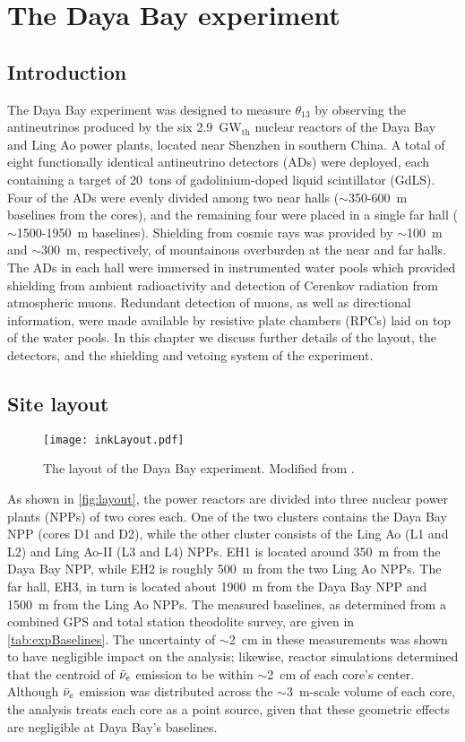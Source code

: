 \documentclass[../thesis.tex]{subfiles}
\begin{document}
\chapter{The Daya Bay experiment}
\label{chap:experim}

\section*{Introduction}

The Daya Bay experiment was designed to measure $\theta_{13}$ by observing the antineutrinos produced by the six 2.9~GW$_{\text{th}}$ nuclear reactors of the Daya Bay and Ling Ao power plants, located near Shenzhen in southern China. A total of eight functionally identical antineutrino detectors (ADs) were deployed, each containing a target of 20~tons of gadolinium-doped liquid scintillator (GdLS). Four of the ADs were evenly divided among two near halls ($\sim$350-600~m baselines from the cores), and the remaining four were placed in a single far hall ($\sim$1500-1950~m baselines). Shielding from cosmic rays was provided by $\sim$100~m and $\sim$300~m, respectively, of mountainous overburden at the near and far halls. The ADs in each hall were immersed in instrumented water pools which provided shielding from ambient radioactivity and detection of Cerenkov radiation from atmospheric muons. Redundant detection of muons, as well as directional information, were made available by resistive plate chambers (RPCs) laid on top of the water pools. In this chapter we discuss further details of the layout, the detectors, and the shielding and vetoing system of the experiment.

\section{Site layout}
\label{sec:expLayout}

\begin{figure}[ht]
  \texttt{[image: inkLayout.pdf]}
  \caption{The layout of the Daya Bay experiment. Modified from \cite{SideBySide}.}
  \label{fig:layout} 
\end{figure}

As shown in \autoref{fig:layout}, the power reactors are divided into three nuclear power plants (NPPs) of two cores each. One of the two clusters contains the Daya Bay NPP (cores D1 and D2), while the other cluster consists of the Ling Ao (L1 and L2) and Ling Ao-II (L3 and L4) NPPs. EH1 is located around 350~m from the Daya Bay NPP, while EH2 is roughly 500~m from the two Ling Ao NPPs. The far hall, EH3, in turn is located about 1900~m from the Daya Bay NPP and 1500~m from the Ling Ao NPPs. The measured baselines, as determined from a combined GPS and total station theodolite survey, are given in \autoref{tab:expBaselines}. The uncertainty of $\sim$2~cm in these measurements was shown to have negligible impact on the analysis; likewise, reactor simulations determined that the centroid of $\bar\nu_e$ emission to be within $\sim$2~cm of each core's center. Although $\bar\nu_e$ emission was distributed across the $\sim$3~m-scale volume of each core, the analysis treats each core as a point source, given that these geometric effects are negligible at Daya Bay's baselines.
\end{document}
